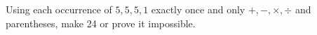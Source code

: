 Using each occurrence of $5,5,5,1$ exactly once and only $+,-,\times,\div$ and parentheses, make 24 or prove it impossible.

